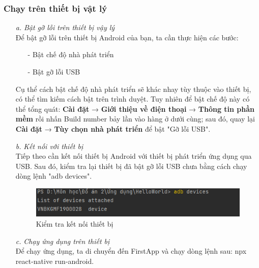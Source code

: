 \subsubsection{Chạy trên thiết bị vật lý}
\begin{enumerate}
    \item[\textit{a.}] {\textit{Bật gỡ lỗi trên thiết bị vậy lý}}\\
    Để bật gỡ lỗi trên thiết bị Android của bạn, ta cần thực hiện các bước:
    \begin{enumerate}
        \item[-] Bật chế độ nhà phát triển
        \item[-] Bật gỡ lỗi USB
    \end{enumerate}
    Cụ thể cách bật chế độ nhà phát triển sẽ khác nhay tùy thuộc vào thiết bị, có thể tìm kiếm cách bật trên trình duyệt. Tuy nhiên để bật chế độ này có thể tổng quát: \textbf{Cài đặt} → \textbf{Giới thiệu về điện thoại} → \textbf{Thông tin phần mềm} rồi nhấn Build number bảy lần vào hàng ở dưới cùng; sau đó, quay lại \textbf{Cài đặt} → \textbf{Tùy chọn nhà phát triển} để bật "Gỡ lỗi USB".
    \item[\textit{b.}] {\textit{Kết nối với thiết bị}}\\
    Tiếp theo cần kết nối thiết bị Android với thiết bị phát triển ứng dụng qua USB. Sau đó, kiểm tra lại thiết bị đã bật gỡ lỗi USB chưa bằng cách chạy dòng lệnh "adb devices".
    \begin{figure}[!ht]
        \centering
        \includegraphics[width=1\textwidth]{images/checkDevices.png}
        \caption{Kiểm tra kết nối thiết bị}
    \end{figure}
    \item[\textit{c.}] {\textit{Chạy ứng dụng trên thiết bị}}\\
    Để chạy ứng dụng, ta di chuyển đến FirstApp và chạy dòng lệnh sau: npx react-native run-android.
\end{enumerate}
